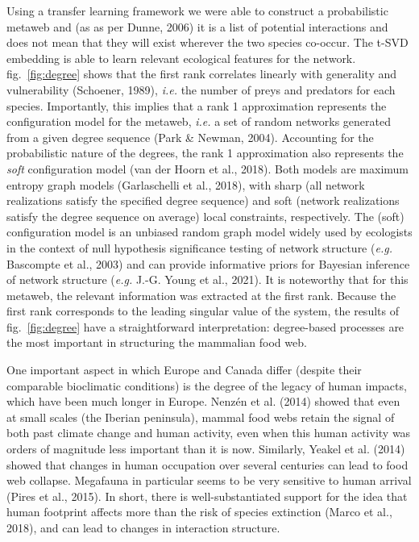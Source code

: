 \documentclass[11pt]{article}
\begin{document}
Using a transfer learning framework we were able to construct a
probabilistic metaweb and (as as per Dunne, 2006) it is a list of
potential interactions and does not mean that they will exist wherever
the two species co-occur. The t-SVD embedding is able to learn relevant
ecological features for the network. fig.~\ref{fig:degree} shows that
the first rank correlates linearly with generality and vulnerability
(Schoener, 1989), \emph{i.e.} the number of preys and predators for each
species. Importantly, this implies that a rank 1 approximation
represents the configuration model for the metaweb, \emph{i.e.} a set of
random networks generated from a given degree sequence (Park \& Newman,
2004). Accounting for the probabilistic nature of the degrees, the rank
1 approximation also represents the \emph{soft} configuration model (van
der Hoorn et al., 2018). Both models are maximum entropy graph models
(Garlaschelli et al., 2018), with sharp (all network realizations
satisfy the specified degree sequence) and soft (network realizations
satisfy the degree sequence on average) local constraints, respectively.
The (soft) configuration model is an unbiased random graph model widely
used by ecologists in the context of null hypothesis significance
testing of network structure (\emph{e.g.} Bascompte et al., 2003) and
can provide informative priors for Bayesian inference of network
structure (\emph{e.g.} J.-G. Young et al., 2021). It is noteworthy that
for this metaweb, the relevant information was extracted at the first
rank. Because the first rank corresponds to the leading singular value
of the system, the results of fig.~\ref{fig:degree} have a
straightforward interpretation: degree-based processes are the most
important in structuring the mammalian food web.

One important aspect in which Europe and Canada differ (despite their
comparable bioclimatic conditions) is the degree of the legacy of human
impacts, which have been much longer in Europe. Nenzén et al. (2014)
showed that even at small scales (the Iberian peninsula), mammal food
webs retain the signal of both past climate change and human activity,
even when this human activity was orders of magnitude less important
than it is now. Similarly, Yeakel et al. (2014) showed that changes in
human occupation over several centuries can lead to food web collapse.
Megafauna in particular seems to be very sensitive to human arrival
(Pires et al., 2015). In short, there is well-substantiated support for
the idea that human footprint affects more than the risk of species
extinction (Marco et al., 2018), and can lead to changes in interaction
structure.
\end{document}
